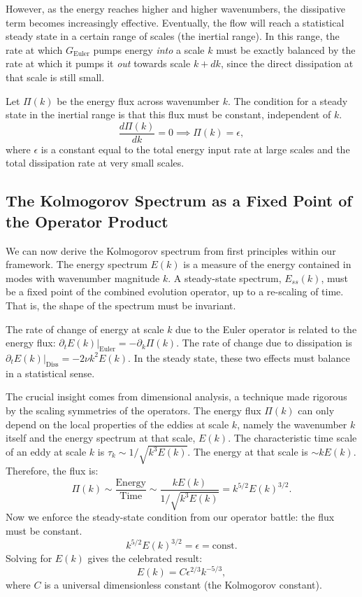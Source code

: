 However, as the energy reaches higher and higher wavenumbers, the dissipative term becomes increasingly effective. Eventually, the flow will reach a statistical steady state in a certain range of scales (the inertial range). In this range, the rate at which $G_{\text{Euler}}$ pumps energy \emph{into} a scale $k$ must be exactly balanced by the rate at which it pumps it \emph{out} towards scale $k+dk$, since the direct dissipation at that scale is still small.

Let $\Pi(k)$ be the energy flux across wavenumber $k$. The condition for a steady state in the inertial range is that this flux must be constant, independent of $k$.
\begin{equation}
    \frac{d\Pi(k)}{dk} = 0 \implies \Pi(k) = \epsilon,
\end{equation}
where $\epsilon$ is a constant equal to the total energy input rate at large scales and the total dissipation rate at very small scales.

\subsection{The Kolmogorov Spectrum as a Fixed Point of the Operator Product}

We can now derive the Kolmogorov spectrum from first principles within our framework. The energy spectrum $E(k)$ is a measure of the energy contained in modes with wavenumber magnitude $k$. A steady-state spectrum, $E_{ss}(k)$, must be a fixed point of the combined evolution operator, up to a re-scaling of time. That is, the shape of the spectrum must be invariant.

The rate of change of energy at scale $k$ due to the Euler operator is related to the energy flux: $\partial_t E(k)|_{\text{Euler}} = -\partial_k \Pi(k)$. The rate of change due to dissipation is $\partial_t E(k)|_{\text{Diss}} = -2\nu k^2 E(k)$. In the steady state, these two effects must balance in a statistical sense.

The crucial insight comes from dimensional analysis, a technique made rigorous by the scaling symmetries of the operators. The energy flux $\Pi(k)$ can only depend on the local properties of the eddies at scale $k$, namely the wavenumber $k$ itself and the energy spectrum at that scale, $E(k)$. The characteristic time scale of an eddy at scale $k$ is $\tau_k \sim 1/\sqrt{k^3 E(k)}$. The energy at that scale is $\sim k E(k)$. Therefore, the flux is:
\begin{equation}
    \Pi(k) \sim \frac{\text{Energy}}{\text{Time}} \sim \frac{k E(k)}{1/\sqrt{k^3 E(k)}} = k^{5/2} E(k)^{3/2}.
\end{equation}
Now we enforce the steady-state condition from our operator battle: the flux must be constant.
\begin{equation}
    k^{5/2} E(k)^{3/2} = \epsilon = \text{const}.
\end{equation}
Solving for $E(k)$ gives the celebrated result:
\begin{equation}
    E(k) = C \epsilon^{2/3} k^{-5/3},
\end{equation}
where $C$ is a universal dimensionless constant (the Kolmogorov constant).

